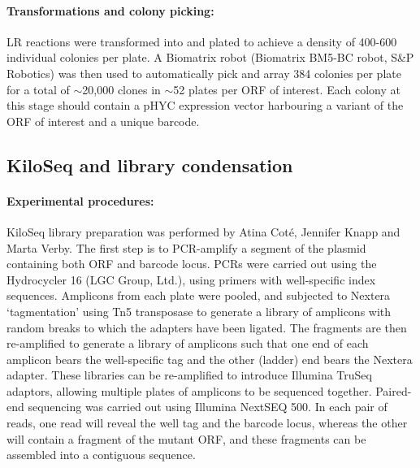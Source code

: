\paragraph{Transformations and colony picking:} LR reactions were transformed into  and plated to achieve a density of 400-600 individual colonies per plate. A Biomatrix robot (Biomatrix BM5-BC robot, S\&P Robotics) was then used to automatically pick and array 384 colonies per plate for a total of $\sim$20,000 clones in $\sim$52 plates per ORF of interest. Each colony at this stage should contain a pHYC expression vector harbouring a variant of the ORF of interest and a unique barcode.

\subsection{KiloSeq and library condensation}

\paragraph{Experimental procedures:} KiloSeq library preparation was performed by Atina Cot\'e, Jennifer Knapp and Marta Verby. 
The first step is to PCR-amplify a segment of the plasmid containing both ORF and barcode locus. PCRs were carried out using the Hydrocycler 16 (LGC Group, Ltd.), using primers with well-specific index sequences. Amplicons from each plate were pooled, and subjected to Nextera ‘tagmentation’ using Tn5 transposase to generate a library of amplicons with random breaks to which the adapters have been ligated. The fragments are then re-amplified to generate a library of amplicons such that one end of each amplicon bears the well-specific tag and the other (ladder) end bears the Nextera adapter. These libraries can be re-amplified to introduce Illumina TruSeq adaptors, allowing multiple plates of amplicons to be sequenced together.  Paired-end sequencing was carried out using Illumina NextSEQ 500. In each pair of reads, one read will reveal the well tag and the barcode locus, whereas the other will contain a fragment of the mutant ORF, and these fragments can be assembled into a contiguous sequence.


